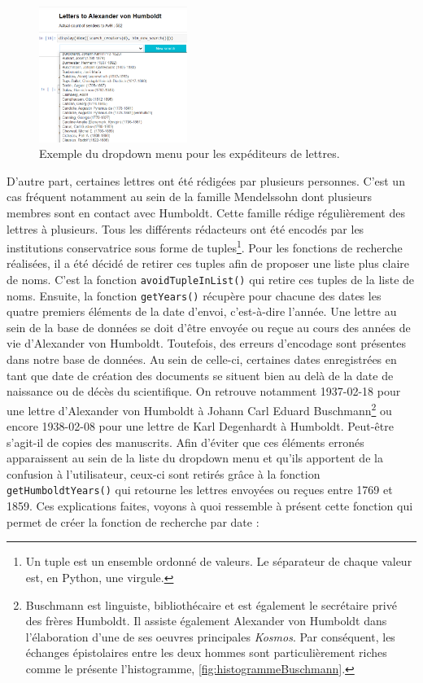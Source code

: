 \documentclass[a4paper, 12pt, twoside]{book}
\begin{document}
\begin{figure}
\vspace{-10pt}
\includegraphics[width=0.43\textwidth]{img/recherche_dropdown.png}
\caption{Exemple du dropdown menu pour les expéditeurs de lettres.}
\vspace{-10pt}
\end{figure}
D'autre part, certaines lettres ont été rédigées par plusieurs personnes. C'est un cas fréquent notamment au sein de la famille Mendelssohn dont plusieurs membres sont en contact avec Humboldt. Cette famille rédige régulièrement des lettres à plusieurs. Tous les différents rédacteurs ont été encodés par les institutions conservatrice sous forme de tuples\footnote{Un tuple est un ensemble ordonné de valeurs. Le séparateur de chaque valeur est, en Python, une virgule.}. Pour les fonctions de recherche réalisées, il a été décidé de retirer ces tuples afin de proposer une liste plus claire de noms. C'est la fonction \texttt{avoidTupleInList()} qui retire ces tuples de la liste de noms. Ensuite, la fonction \texttt{getYears()} récupère pour chacune des dates les quatre premiers éléments de la date d'envoi, c'est-à-dire l'année. Une lettre au sein de la base de données se doit d'être envoyée ou reçue au cours des années de vie d'Alexander von Humboldt. Toutefois, des erreurs d'encodage sont présentes dans notre base de données. Au sein de celle-ci, certaines dates enregistrées en tant que date de création des documents se situent bien au delà de la date de naissance ou de décès du scientifique. On retrouve notamment 1937-02-18 pour une lettre d'Alexander von Humboldt à Johann Carl Eduard Buschmann\footnote{Buschmann est linguiste, bibliothécaire et est également le secrétaire privé des frères Humboldt. Il assiste également Alexander von Humboldt dans l'élaboration d'une de ses oeuvres principales \textit{Kosmos}. Par conséquent, les échanges épistolaires entre les deux hommes sont particulièrement riches comme le présente l'histogramme, \autoref{fig:histogrammeBuschmann}.} ou encore 1938-02-08 pour une lettre de Karl Degenhardt à Humboldt. Peut-être s'agit-il de copies des manuscrits. Afin d'éviter que ces éléments erronés apparaissent au sein de la liste du dropdown menu et qu'ils apportent de la confusion à l'utilisateur, ceux-ci sont retirés grâce à la fonction \texttt{getHumboldtYears()} qui retourne les lettres envoyées ou reçues entre 1769 et 1859. 
Ces explications faites, voyons à quoi ressemble à présent cette fonction qui permet de créer la fonction de recherche par date :
\end{document}

